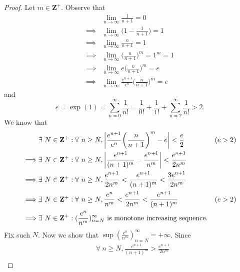 \begin{proof}
    Let \(m \in \mathbf{Z}^+\).
    Observe that
    \begin{align*}
                 & \lim_{n \to \infty} \frac{1}{n + 1} = 0                                     \\
        \implies & \lim_{n \to \infty} \bigg(1 - \frac{1}{n + 1}\bigg) = 1                     \\
        \implies & \lim_{n \to \infty} \frac{n}{n + 1} = 1                                     \\
        \implies & \lim_{n \to \infty} \bigg(\frac{n}{n + 1}\bigg)^m = 1^m = 1                 \\
        \implies & \lim_{n \to \infty} e \bigg(\frac{n}{n + 1}\bigg)^m = e                     \\
        \implies & \lim_{n \to \infty} \frac{e^{n + 1}}{e^n} \bigg(\frac{n}{n + 1}\bigg)^m = e
    \end{align*}
    and
    \[
        e = \exp(1) = \sum_{n = 0}^\infty \frac{1}{n!} = \frac{1}{0!} + \frac{1}{1!} + \sum_{n = 2}^\infty \frac{1}{n!} > 2.
    \]
    We know that
    \begin{align*}
                 & \exists\ N \in \mathbf{Z}^+ : \forall\ n \geq N, \abs*{\frac{e^{n + 1}}{e^n} \bigg(\frac{n}{n + 1}\bigg)^m - e} < \frac{e}{2}         & (e > 2) \\
        \implies & \exists\ N \in \mathbf{Z}^+ : \forall\ n \geq N, \abs*{\frac{e^{n + 1}}{(n + 1)^m} - \frac{e^{n + 1}}{n^m}} < \frac{e^{n + 1}}{2 n^m}           \\
        \implies & \exists\ N \in \mathbf{Z}^+ : \forall\ n \geq N, \frac{e^{n + 1}}{2 n^m} < \frac{e^{n + 1}}{(n + 1)^m} < \frac{3 e^{n + 1}}{2 n^m}              \\
        \implies & \exists\ N \in \mathbf{Z}^+ : \forall\ n \geq N, \frac{e^n}{n^m} < \frac{e^{n + 1}}{2 n^m} < \frac{e^{n + 1}}{(n + 1)^m}              & (e > 2) \\
        \implies & \exists\ N \in \mathbf{Z}^+ : (\frac{e^n}{n^m})_{n = N}^\infty \text{ is monotone increasing sequence}.
    \end{align*}
    Fix such \(N\).
    Now we show that \(\sup(\frac{e^n}{n^m})_{n = N}^\infty = +\infty\).
    Since
    \begin{align*}
                 & \forall\ n \geq N, \frac{e^{n + 1}}{(n + 1)^m} > \frac{e^{n + 1}}{2 n^m}                                                                           \\

\end{align*}
\end{proof}
